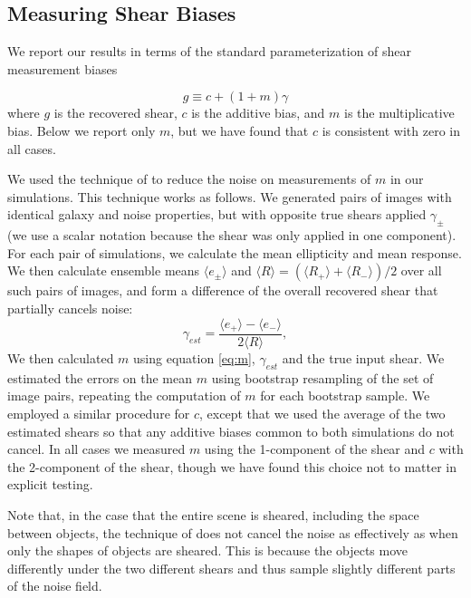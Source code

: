 \documentclass[draft, iop, twocolappendix, appendixfloats, numberedappendix, apj]{hackemulateapj}
\begin{document}
\subsection{Measuring Shear Biases}

We report our results in terms of the standard parameterization of shear
measurement biases \citep[see, e.g.,][]{heymans2006}

\begin{equation} \label{eq:m}
g \equiv c + (1 + m)\gamma
\end{equation}
where $g$ is the recovered shear, $c$ is the additive bias, and $m$ is the
multiplicative bias. Below we report only $m$, but we have found that $c$ is
consistent with zero in all cases.

We used the technique of \citet{pujol2019} to reduce the noise on measurements
of $m$ in our simulations.  This technique works as follows. We generated pairs
of images with identical galaxy and noise properties, but with opposite true
shears applied $\gamma_{\pm}$ (we use a scalar notation because the shear
was only applied in one component).  For each pair of simulations, we calculate the mean
ellipticity and mean response.  We then calculate ensemble means $\langle e_\pm \rangle$
and $\langle R \rangle = ( \langle R_+ \rangle + \langle R_- \rangle)/2$ over all such
pairs of images, and form a difference of the overall recovered shear that
partially cancels noise:
\begin{equation}
    \gamma_{est} = \frac{ \langle e_+ \rangle - \langle e_- \rangle}{2 \langle R \rangle},
\end{equation}
We then calculated $m$ using equation \ref{eq:m}, $\gamma_{est}$ and the true
input shear.  We estimated the errors on the mean $m$ using bootstrap
resampling of the set of image pairs, repeating the computation of $m$ for each
bootstrap sample. We employed a similar procedure for $c$, except that we used
the average of the two estimated shears so that any additive biases common to
both simulations do not cancel. In all  cases we measured $m$ using the
1-component of the shear and $c$ with the 2-component of the shear, though we
have found this choice not to matter in explicit testing.

Note that, in the case that the entire scene is sheared, including the space
between objects, the technique of \citet{pujol2019} does not cancel the noise
as effectively as when only the shapes of objects are sheared.  This is because
the objects move differently under the two different shears and thus sample
slightly different parts of the noise field.
\end{document}
